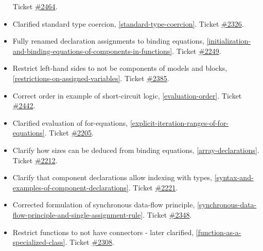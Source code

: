 \begin{itemize}
Ticket \href{https://github.com/modelica/ModelicaSpecification/issues/2464}{\#2464}.
\item Clarified standard type coercion, \cref{standard-type-coercion}.
Ticket \href{https://github.com/modelica/ModelicaSpecification/issues/2326}{\#2326}.
\item Fully renamed declaration assignments to binding equations, \cref{initialization-and-binding-equations-of-components-in-functions}.
Ticket \href{https://github.com/modelica/ModelicaSpecification/issues/2249}{\#2249}.
\item Restrict left-hand sides to not be components of models and blocks, \cref{restrictions-on-assigned-variables}.
Ticket \href{https://github.com/modelica/ModelicaSpecification/issues/2385}{\#2385}.
\item Correct order in example of short-circuit logic, \cref{evaluation-order}.
Ticket \href{https://github.com/modelica/ModelicaSpecification/issues/2442}{\#2442}.
\item Clarified evaluation of for-equations, \cref{explicit-iteration-ranges-of-for-equations}.
Ticket \href{https://github.com/modelica/ModelicaSpecification/issues/2205}{\#2205}.
\item Clarify how sizes can be deduced from binding equations, \cref{array-declarations}.
Ticket \href{https://github.com/modelica/ModelicaSpecification/issues/2212}{\#2212}.
\item Clarify that component declarations allow indexing with types, \cref{syntax-and-examples-of-component-declarations}.
Ticket \href{https://github.com/modelica/ModelicaSpecification/issues/2221}{\#2221}.
\item Corrected formulation of synchronous data-flow principle, \cref{synchronous-data-flow-principle-and-single-assignment-rule}.
Ticket \href{https://github.com/modelica/ModelicaSpecification/issues/2348}{\#2348}.
\item Restrict functions to not have connectors - later clarified, \cref{function-as-a-specialized-class}.
Ticket \href{https://github.com/modelica/ModelicaSpecification/pull/2308}{\#2308}.


\end{itemize}
